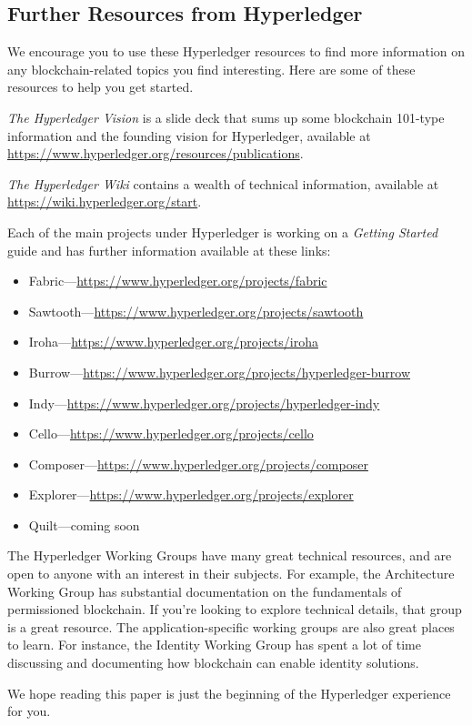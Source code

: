 \subsection{Further Resources from Hyperledger}
We encourage you to use these Hyperledger resources to find more information on any blockchain-related topics you find interesting. Here are some of these resources to help you get started. 

\emph{The Hyperledger Vision} is a slide deck that sums up some blockchain 101-type information and the founding vision for Hyperledger, available at \url{https://www.hyperledger.org/resources/publications}. 
 
\emph{The Hyperledger Wiki} contains a wealth of technical information, available at \url{https://wiki.hyperledger.org/start}.

Each of the main projects under Hyperledger is working on a \emph{Getting Started} guide and has further information available at these links:
\begin{itemize}
\item Fabric---\url{https://www.hyperledger.org/projects/fabric}
\item Sawtooth---\url{https://www.hyperledger.org/projects/sawtooth}
\item Iroha---\url{https://www.hyperledger.org/projects/iroha}
\item Burrow---\url{https://www.hyperledger.org/projects/hyperledger-burrow}
\item Indy---\url{https://www.hyperledger.org/projects/hyperledger-indy}
\item Cello---\url{https://www.hyperledger.org/projects/cello}
\item Composer---\url{https://www.hyperledger.org/projects/composer}
\item Explorer---\url{https://www.hyperledger.org/projects/explorer}
\item Quilt---coming soon \url{}
\end{itemize} 

The Hyperledger Working Groups have many great technical resources, and are open to anyone with an interest in their subjects. For example, the Architecture Working Group has substantial documentation on the fundamentals of permissioned blockchain. If you're looking to explore technical details, that group is a great resource. The application-specific working groups are also great places to learn. For instance, the Identity Working Group has spent a lot of time discussing and documenting how blockchain can enable identity solutions. 

We hope reading this paper is just the beginning of the Hyperledger experience for you. 
